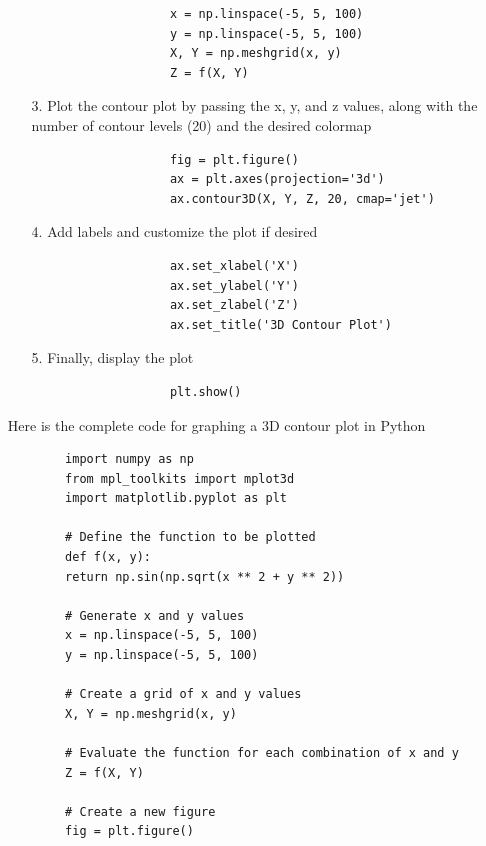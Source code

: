 \documentclass[
11pt, %
a4paper, %
oneside, %
headinclude,footinclude, %
BCOR5mm, %
]{scrartcl}
\begin{document}
\begin{enumerate}
\begin{enumerate}
\begin{enumerate}
\begin{verbatim}
				x = np.linspace(-5, 5, 100)
				y = np.linspace(-5, 5, 100)
				X, Y = np.meshgrid(x, y)
				Z = f(X, Y)
			\end{verbatim}
		\end{enumerate}
		\item[3.] Plot the contour plot by passing the x, y, and z values, along with the number of contour levels (20) and the desired colormap
		\begin{enumerate}
			\item[] \begin{verbatim}
				fig = plt.figure()
				ax = plt.axes(projection='3d')
				ax.contour3D(X, Y, Z, 20, cmap='jet')
			\end{verbatim}
		\end{enumerate}
		\item[4.] Add labels and customize the plot if desired
		\begin{enumerate}
			\item[] \begin{verbatim}
				ax.set_xlabel('X')
				ax.set_ylabel('Y')
				ax.set_zlabel('Z')
				ax.set_title('3D Contour Plot')
			\end{verbatim}
		\end{enumerate}
		\item[5.] Finally, display the plot
		\begin{enumerate}
			\item[] \begin{verbatim}
				plt.show()
			\end{verbatim}
		\end{enumerate}
	\end{enumerate}
	
	Here is the complete code for graphing a 3D contour plot in Python
	
	\begin{verbatim}
		import numpy as np
		from mpl_toolkits import mplot3d
		import matplotlib.pyplot as plt
		
		# Define the function to be plotted
		def f(x, y):
		return np.sin(np.sqrt(x ** 2 + y ** 2))
		
		# Generate x and y values
		x = np.linspace(-5, 5, 100)
		y = np.linspace(-5, 5, 100)
		
		# Create a grid of x and y values
		X, Y = np.meshgrid(x, y)
		
		# Evaluate the function for each combination of x and y
		Z = f(X, Y)
		
		# Create a new figure
		fig = plt.figure()
		

\end{verbatim}
\end{enumerate}
\end{document}
